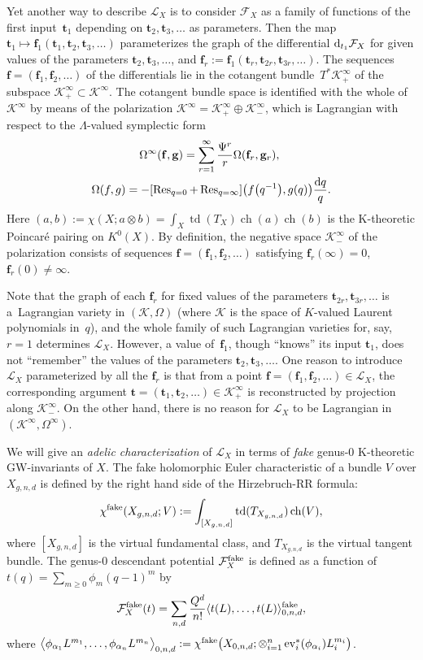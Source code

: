 \documentclass[pdftex]{sigma}
\def\F{\mathcal F}
\def\K{\mathcal K}
\def\L{\mathcal L}
\def\Res{\operatorname{Res}}
\def\a{\alpha}
\def\f{{\mathbf f}}
\def\g{{\mathbf g}}
\def\t{{\mathbf t}}
\def\lan{\langle}
\def\ran{\rangle}
\def\ev{\operatorname{ev}}
\def\td{\operatorname{td}}
\def\ch{\operatorname{ch}}
\begin{document}
Yet another way to describe $\L_X$ is to consider $\F_X$ as a family of functions of the first input~$\t_1$ depending on $\t_2, \t_3,\dots$ as parameters. Then the map $\t_1 \mapsto \f_1(\t_1, \t_2,\t_3,\dots)$ para\-meterizes the graph of the differential ${\rm d}_{t_1}\F_X$ for given values of the parameters $\t_2,\t_3,\dots$, and $\f_r:=\f_1(\t_r,\t_{2r},\t_{3r},\dots)$.
The sequences $\f=(\f_1,\f_2,\dots )$ of the differentials lie in the cotangent bundle~$T^*\K_{+}^{\infty}$ of the subspace $\K_{+}^{\infty}\subset \K^{\infty}$. The cotangent bundle space is identified with the whole of~$\K^{\infty}$ by means of the polarization $\K^{\infty}=\K^{\infty}_{+}\oplus\K^{\infty}_{-}$, which is Lagrangian with respect to the $\Lambda$-valued symplectic form
\begin{gather*} \Omega^{\infty}(\f,\g) = \sum_{r=1}^{\infty} \frac{\Psi^r}{r} \Omega (\f_r,\g_r),\ \\
 \Omega(f,g) = - [\Res_{q=0}+\Res_{q=\infty}] \big(f\big(q^{-1}\big), g(q)\big) \frac{{\rm d}q}{q}.\end{gather*}
Here $(a, b):=\chi (X; a\otimes b) = \int_X \td(T_X)\ch(a)\ch(b)$ is the
K-theoretic Poincar\'e pairing on $K^0(X)$.
By definition, the negative space $\K_{-}^{\infty}$ of the polarization consists of sequences $\f = (\f_1,\f_2,\dots)$ satisfying $\f_r(\infty)=0$, $\f_r(0)\neq \infty$.

\begin{remark} Note that the graph of each $\f_r$ for fixed values of the parameters $\t_{2r}, \t_{3r}, \dots$ is a~Lagrangian variety in $(\K, \Omega)$ (where $\K$ is the space of $K$-valued Laurent polynomials in~$q$), and the whole family of such Lagrangian varieties for, say, $r=1$ determines $\L_X$. However, a value of~$\f_1$, though ``knows'' its input $\t_1$, does not ``remember'' the values of the parameters $\t_2,\t_3,\dots$. One reason to introduce $\L_X$ parameterized by all the $\f_r$ is that from a point $\f=(\f_1,\f_2,\dots)\in \L_X$, the corresponding argument $\t=(\t_1,\t_2,\dots) \in \K^{\infty}_{+}$ is reconstructed by projection along $\K^{\infty}_{-}$. On the other hand, there is no reason for $\L_X$ to be Lagrangian in $(\K^{\infty},\Omega^{\infty})$.
\end{remark}

We will give an {\em adelic characterization} of $\L_X$ in terms of {\em fake}
genus-0 K-theoretic GW-invariants of $X$. The fake holomorphic Euler characteristic of a bundle $V$ over $X_{g,n,d}$ is defined by the right hand side of the Hirzebruch-RR formula:
\[ \chi^{\rm fake}(X_{g,n,d}; V):= \int_{[X_{g,n,d}]} \td (T_{X_{g,n,d}}) \ch (V),\]
where $[X_{g,n,d}]$ is the virtual fundamental class, and $T_{X_{g,n,d}}$ is the virtual tangent bundle. The genus-0 descendant potential $\F_X^{\rm fake}$ is defined as a function of $t(q)=\sum_{m\geq 0} \phi_m (q-1)^m$ by
\[ \F_X^{\rm fake}(t)=\sum_{n,d}\frac{Q^d}{n!} \lan t(L),\dots,t(L)\ran_{0,n,d}^{\rm fake},\]
where $\big\lan \phi_{\a_1} L^{m_1},\dots, \phi_{\a_n} L^{m_n}\big\ran_{0,n,d}:=\chi^{\rm fake}\big(X_{0,n,d};\otimes_{i=1}^n\ev_i^*(\phi_{\a_i}) L_i^{m_i}\big)$.
\end{document}
